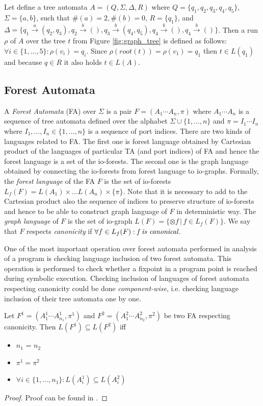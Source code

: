 \bexmp
Let define a tree automata $A=(Q,\Sigma,\Delta, R)$
where $Q=\{q_1,q_2,q_3,q_4,q_5\}$, $\Sigma = \{a,b\}$,
such that $\#(a) = 2, \#(b) =0$, $R=\{q_1\}$,
and $\Delta=\{q_1 \xrightarrow{a} (q_2,q_3), q_2 \xrightarrow{b} (),
q_3 \xrightarrow{b} (q_4,q_5), q_4 \xrightarrow{b} (), q_4 \xrightarrow{b} ()\}$.
Then a run $\rho$ of $A$ over the tree $t$ from Figure \ref{fig:graph_tree}
is defined as follows: $\forall i \in \{1,\ldots,5\}: \rho(v_i) = q_i$.
Since $\rho(root(t)) = \rho(v_1) = q_1$ then $t \in L(q_1)$ and because $q \in R$
it also holds $t \in L(A)$.
\label{ex:ta}
\eexmp

\subsection{Forest Automata}
\label{subsec:fa}

A \emph{Forest Automata} (FA) over $\Sigma$ is a pair $F=(A_1\cdots A_n, \pi)$
where $A_1 \cdots A_n$ is a sequence of tree automata defined over the alphabet $\Sigma \cup \{1,\ldots,n\}$
and $\pi = I_1 \cdots I_n$ where $I_1,\ldots, I_n \in \{1, \ldots, n\}$ is a sequence of port indices.
There are two kinds of languages related to FA.
The first one is forest language obtained by Cartesian product of the languages of particular TA (and port indices) of FA
and hence the forest language is a set of the io-forests.
The second one is the graph language obtained by connecting the io-forests from forest language to io-graphs.
Formally, the \emph{forest language} of the FA $F$ is the set of io-forests $L_f(F)= L(A_1) \times \ldots L(A_n) \times \{\pi\}$.
Note that it is necessary to add to the Cartesian product also the sequence of indices to preserve structure of io-forests
and hence to be able to construct graph language of $F$ in deterministic way.
The \emph{graph language} of $F$ is the set of io-graph $L(F) = \{\otimes f\,|\, f \in L_f(F)\}$.
We say that $F$ respects \emph{canonicity} if $\forall f \in L_f(F): \emph{f is canonical}$.

One of the most important operation over forest automata performed in analysis of a program is checking
language inclusion of two forest automata.
This operation is performed to check whether a fixpoint in a program point is reached during symbolic execution.
Checking inclusion of languages of forest automata respecting canonicity could be done \emph{component-wise},
i.e. checking language inclusion of their tree automata one by one.

\begin{lemma}
	Let $F^1 = (A_1^1\cdots A_{n_{1}}^1, \pi^1)$ and $F^2 = (A_1^2\cdots A_{n_{2}}^2, \pi^2)$
	be two FA respecting canonicity.
	Then $L(F^1) \subseteq L(F^2)$ iff
	\begin{itemize}
			\item $n_1$ = $n_2$
			\item $\pi^1 = \pi^2$
			\item $\forall i \in \{1,\ldots,n_1\}: L(A_i^1) \subseteq L(A_i^2)$
	\end{itemize}
\end{lemma}
\begin{proof}
	Proof can be found in \cite{forester:techrep}.
\end{proof}

